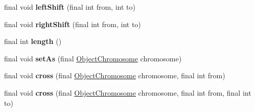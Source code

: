 \begin{DoxyCompactItemize}
\item 
\hypertarget{classjenes_1_1chromosome_1_1_object_chromosome_a1e1570b75182f3d244a6d857a6acb7bf}{final void {\bfseries left\-Shift} (final int from, int to)}\label{classjenes_1_1chromosome_1_1_object_chromosome_a1e1570b75182f3d244a6d857a6acb7bf}

\item 
\hypertarget{classjenes_1_1chromosome_1_1_object_chromosome_a584d10eceb2858e0ef88ea7f7c21d83c}{final void {\bfseries right\-Shift} (final int from, int to)}\label{classjenes_1_1chromosome_1_1_object_chromosome_a584d10eceb2858e0ef88ea7f7c21d83c}

\item 
\hypertarget{classjenes_1_1chromosome_1_1_object_chromosome_a12ff61d91455ed5915bcf71c889ea1dd}{final int {\bfseries length} ()}\label{classjenes_1_1chromosome_1_1_object_chromosome_a12ff61d91455ed5915bcf71c889ea1dd}

\item 
\hypertarget{classjenes_1_1chromosome_1_1_object_chromosome_a77fd7d633e3663ea8fb63db2857bb1b7}{final void {\bfseries set\-As} (final \hyperlink{classjenes_1_1chromosome_1_1_object_chromosome}{Object\-Chromosome} chromosome)}\label{classjenes_1_1chromosome_1_1_object_chromosome_a77fd7d633e3663ea8fb63db2857bb1b7}

\item 
\hypertarget{classjenes_1_1chromosome_1_1_object_chromosome_a8f0770f15071e71ee86d7ad43541118f}{final void {\bfseries cross} (final \hyperlink{classjenes_1_1chromosome_1_1_object_chromosome}{Object\-Chromosome} chromosome, final int from)}\label{classjenes_1_1chromosome_1_1_object_chromosome_a8f0770f15071e71ee86d7ad43541118f}

\item 
\hypertarget{classjenes_1_1chromosome_1_1_object_chromosome_a25225ffc89dae70e0b0ddeb21f8f125d}{final void {\bfseries cross} (final \hyperlink{classjenes_1_1chromosome_1_1_object_chromosome}{Object\-Chromosome} chromosome, final int from, final int to)}\label{classjenes_1_1chromosome_1_1_object_chromosome_a25225ffc89dae70e0b0ddeb21f8f125d}


\end{DoxyCompactItemize}
